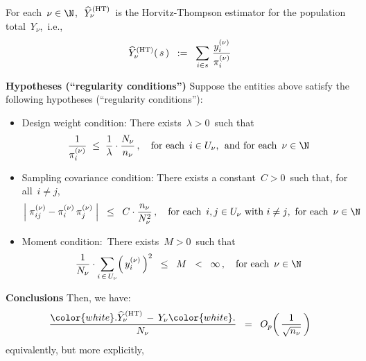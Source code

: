 \begin{theorem}
\begin{itemize}
    For each \,$\nu\in\N$,\,
    \,$\widehat{Y}^{\textnormal{(HT)}}_{\nu}$\,
    is the Horvitz-Thompson estimator for the population total \,$Y_{\nu}$,\, i.e.,
    \begin{equation*}
    \widehat{Y}^{\textnormal{(HT)}}_{\nu}(\,s\,)
    \;\; := \;\;
        \underset{i \in s}{\sum}\;
        \dfrac{ y^{(\nu)}_{i} }{ \pi^{(\nu)}_{i} }
    \end{equation*}
\end{itemize}
\vskip 0.2cm
\noindent
\textbf{Hypotheses (``regularity conditions'')}
\vskip 0.1cm
\noindent
Suppose the entities above satisfy the following hypotheses (``regularity conditions''):
\begin{itemize}
\item
    Design weight condition:
    There exists \,$\lambda > 0$\,
    such that
    \begin{equation*}
    \dfrac{1}{\pi^{(\nu)}_{i}}
    \;\leq\;
        \dfrac{1}{\lambda}
        \cdot
        \dfrac{N_{\nu}}{n_{\nu}}\,,
    \quad
    \textnormal{for each \,$i \in U_{\nu}$,\; and for each \,$\nu \in \N$}
    \end{equation*}
\item
    Sampling covariance condition:
    There exists a constant \,$C > 0$\, such that,
    for all \,$i \neq j$,\,
    \begin{equation*}
    \left\vert\; \pi^{(\nu)}_{ij} - \pi^{(\nu)}_{i}\,\pi^{(\nu)}_{j} \;\right\vert
    \;\; \leq \;\;
        C\cdot\dfrac{n_{\nu}}{N_{\nu}^{2}}\,,
    \quad
    \textnormal{for each \,$i,j \in U_{\nu}$ with $i \neq j$,\, for each \,$\nu\in\N$}
    \end{equation*}
\item
    Moment condition:\,
    There exists \,$M > 0$\, such that
    \begin{equation*}
    \dfrac{1}{N_{\nu}}\cdot\underset{i\,\in\,U_{\nu}}{\sum}\!\left(\,y^{(\nu)}_{i}\,\right)^{2}
    \;\; \leq \;\; M \;\; < \;\; \infty\,,
    \quad
    \textnormal{for each \,$\nu\in\N$}
    \end{equation*}
\end{itemize}
\vskip 0.2cm
\noindent
\textbf{Conclusions}
\vskip 0.1cm
\noindent
Then, we have:
\begin{equation*}
\dfrac{
    {\color{white}.}
    \widehat{Y}^{\textnormal{(HT)}}_{\nu} \,-\, Y_{\nu}
    {\color{white}.}
    }{
    N_{\nu}
    }
\;\; = \;\;
    O_{p}\!\left(\,\dfrac{1}{\sqrt{n_{\nu}}}\,\right)
\end{equation*}
equivalently, but more explicitly,

\end{theorem}
